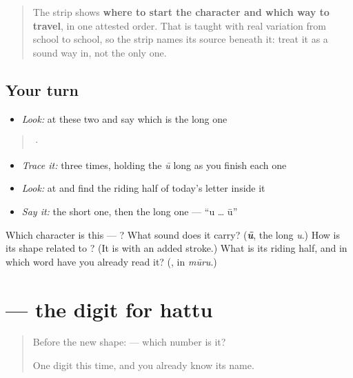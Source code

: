 \begin{quote}
The strip shows \textbf{where to start the character and which way to travel}, in one attested order. That is taught with real variation from school to school, so the strip names its source beneath it: treat it as a sound way in, not the only one.
\end{quote}

\subsection*{Your turn}
\begin{itemize}
\raggedright
  \item \emph{Look:} at these two and say which is the long one
\end{itemize}

\begin{quote}
  ·  
\end{quote}

\begin{itemize}
\raggedright
  \item \emph{Trace it:}  three times, holding the \emph{ū} long as you finish each one
  \item \emph{Look:} at  and find the riding half of today's letter inside it
  \item \emph{Say it:} the short one, then the long one — \textquotedblleft{}u … ū\textquotedblright{}
\end{itemize}

\begin{tcolorbox}[breakable,colback=teal!4,colframe=teal!35!black,title={Before you move on}]
Which character is this — ? What sound does it carry? (\emph{\textbf{ū}}, the long \emph{u}.) How is its shape related to ? (It is  with an added stroke.) What is its riding half, and in which word have you already read it? (\textbf{}, in \emph{mūru}.)
\end{tcolorbox}
\section[\texorpdfstring{\kn{೦} (0)}{೦ (0)}]{ — the digit for hattu}

\label{lesson:KA-S149-digit-zero}



\begin{quote}
Before the new shape: \textbf{} — which number is it?

One digit this time, and you already know its name.
\end{quote}

